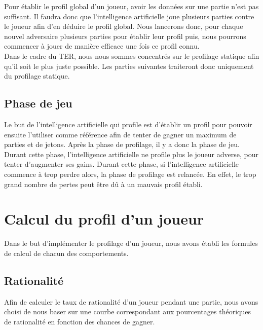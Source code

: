 \documentclass{report}
\begin{document}
Pour établir le profil global d'un joueur, avoir les données sur une partie n'est pas suffisant. Il faudra donc que l'intelligence artificielle joue plusieurs parties contre le joueur afin d'en déduire le profil global. Nous lancerons donc, pour chaque nouvel adversaire plusieurs parties pour établir leur profil puis, nous pourrons commencer à jouer de manière efficace une fois ce profil connu.\\

Dans le cadre du TER, nous nous sommes concentrés sur le profilage statique afin qu'il soit le plus juste possible. Les parties suivantes traiteront donc uniquement du profilage statique. \par


\section{Phase de jeu}

\hspace{0.5cm}Le but de l'intelligence artificielle qui profile est d'établir un profil pour pouvoir ensuite l'utiliser comme référence afin de tenter de gagner un maximum de parties et de jetons. Après la phase de profilage, il y a donc la phase de jeu. Durant cette phase, l'intelligence artificielle ne profile plus le joueur adverse, pour tenter d'augmenter ses gains. Durant cette phase, si l'intelligence artificielle commence à trop perdre alors, la phase de profilage est relancée. En effet, le trop grand nombre de pertes peut être dû à un mauvais profil établi. \par




\chapter{Calcul du profil d'un joueur}


\hspace{0.5cm}Dans le but d'implémenter le profilage d'un joueur, nous avons établi les formules de calcul de chacun des comportements. \par

\section{Rationalité}

\hspace{0.5cm}Afin de calculer le taux de rationalité d'un joueur pendant une partie, nous avons choisi de nous baser sur une courbe correspondant aux pourcentages théoriques de rationalité en fonction des chances de gagner. 
\end{document}
